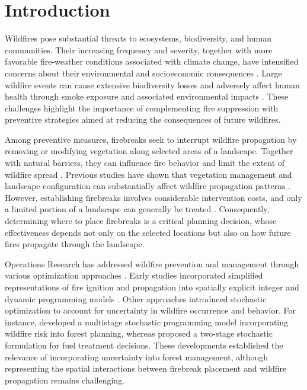 \documentclass{itor}
\begin{document}
\section{Introduction}
\label{sec1}

Wildfires pose substantial threats to ecosystems, biodiversity,
and human communities. Their increasing frequency and severity,
together with more favorable fire-weather conditions associated
with climate change, have intensified concerns about their
environmental and socioeconomic consequences
\citep{jones2020climate,westerling2016increasing}.
Large wildfire events can cause extensive biodiversity losses
\citep{keeley2019fire,kelly2020fire,miranda2023widespread}
and adversely affect human health through smoke exposure
and associated environmental impacts
\citep{delfino2009relationship,dennekamp2011effects,
johnston2009bushfires,johnston2012estimated}.
These challenges highlight the importance of complementing
fire suppression with preventive strategies aimed at reducing
the consequences of future wildfires.

Among preventive measures, firebreaks seek to interrupt wildfire
propagation by removing or modifying vegetation along selected
areas of a landscape. Together with natural barriers, they
can influence fire behavior and limit the extent of wildfire
spread \citep{agee2000use}. Previous studies have shown that
vegetation management and landscape configuration can
substantially affect wildfire propagation patterns
\citep{amiro2001fire,kim2009spatial,cheney1993influence,
carrasco2023firebreak}. However, establishing firebreaks
involves considerable intervention costs, and only a limited
portion of a landscape can generally be treated
\citep{oliveira2016assessing}. Consequently, determining
where to place firebreaks is a critical planning decision,
whose effectiveness depends not only on the selected
locations but also on how future fires propagate
through the landscape.

Operations Research has addressed wildfire prevention and
management through various optimization approaches
\citep{martell2007forest,ronnqvist2015operations}.
Early studies incorporated simplified representations of
fire ignition and propagation into spatially explicit
integer and dynamic programming models
\citep{bettinger2009,kim2009spatial,konoshima2008spatial,
gonzalez2011integrating}. Other approaches introduced
stochastic optimization to account for uncertainty in
wildfire occurrence and behavior. For instance,
\citet{boychuk1996multistage} developed a multistage
stochastic programming model incorporating wildfire risk
into forest planning, whereas \citet{kabli2015stochastic}
proposed a two-stage stochastic formulation for fuel
treatment decisions. These developments established the
relevance of incorporating uncertainty into forest
management, although representing the spatial interactions
between firebreak placement and wildfire propagation
remains challenging.
\end{document}
